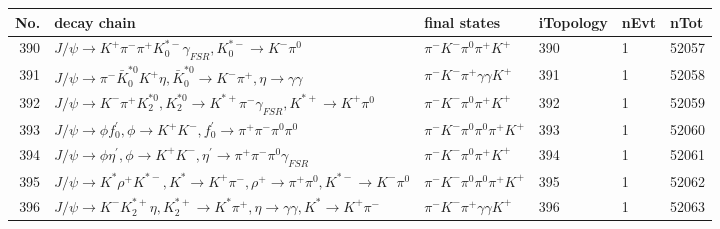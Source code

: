 \begin{table}[htbp] 
\begin{center}
\begin{small}
\begin{tabular}{rlllll}\hline\hline
 No. & decay chain & final states &  iTopology & nEvt & nTot \\\hline
390&$J/\psi       \rightarrow K^{+}          \pi^{-}        \pi^{+}        K_{0}^{*-}     \gamma_{FSR} , K_{0}^{*-}      \rightarrow K^{-}          \pi^{0}        $&$\pi^{-}        K^{-}          \pi^{0}        \pi^{+}        K^{+}          $&  390&    1&52057\\
391&$J/\psi       \rightarrow \pi^{-}        \bar{K}_0^{*0}K^{+}          \eta          , \bar{K}_0^{*0} \rightarrow K^{-}          \pi^{+}        , \eta           \rightarrow \gamma       \gamma       $&$\pi^{-}        K^{-}          \pi^{+}        \gamma       \gamma       K^{+}          $&  391&    1&52058\\
392&$J/\psi       \rightarrow K^{-}          \pi^{+}        K_2^{*0}       , K_2^{*0}        \rightarrow K^{*+}         \pi^{-}        \gamma_{FSR} , K^{*+}          \rightarrow K^{+}          \pi^{0}        $&$\pi^{-}        K^{-}          \pi^{0}        \pi^{+}        K^{+}          $&  392&    1&52059\\
393&$J/\psi       \rightarrow \phi           f^{'}_{0}     , \phi            \rightarrow K^{+}          K^{-}          , f^{'}_{0}      \rightarrow \pi^{+}        \pi^{-}        \pi^{0}        \pi^{0}        $&$\pi^{-}        K^{-}          \pi^{0}        \pi^{0}        \pi^{+}        K^{+}          $&  393&    1&52060\\
394&$J/\psi       \rightarrow \phi           \eta^{\prime} , \phi            \rightarrow K^{+}          K^{-}          , \eta^{\prime}  \rightarrow \pi^{+}        \pi^{-}        \pi^{0}        \gamma_{FSR} $&$\pi^{-}        K^{-}          \pi^{0}        \pi^{+}        K^{+}          $&  394&    1&52061\\
395&$J/\psi       \rightarrow K^{*}          \rho^{+}      K^{*-}         , K^{*}           \rightarrow K^{+}          \pi^{-}        , \rho^{+}       \rightarrow \pi^{+}        \pi^{0}        , K^{*-}          \rightarrow K^{-}          \pi^{0}        $&$\pi^{-}        K^{-}          \pi^{0}        \pi^{0}        \pi^{+}        K^{+}          $&  395&    1&52062\\
396&$J/\psi       \rightarrow K^{-}          K_2^{*+}       \eta          , K_2^{*+}        \rightarrow K^{*}          \pi^{+}        , \eta           \rightarrow \gamma       \gamma       , K^{*}           \rightarrow K^{+}          \pi^{-}        $&$\pi^{-}        K^{-}          \pi^{+}        \gamma       \gamma       K^{+}          $&  396&    1&52063\\

\end{tabular}
\end{small}
\end{center}
\end{table}
